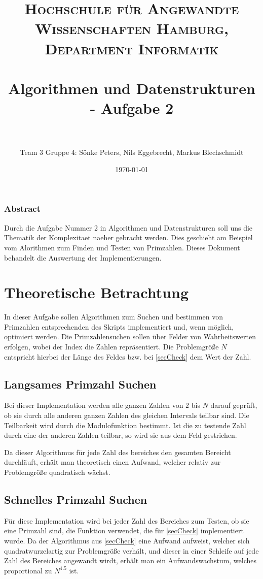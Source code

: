 \documentclass[paper=a4, fontsize=11pt]{scrartcl} %
\title{
\normalfont \normalsize
\textsc{Hochschule für Angewandte Wissenschaften Hamburg, Department Informatik} \\ [25pt] %
\horrule{0.5pt} \\[0.4cm] %
\huge Algorithmen und Datenstrukturen - Aufgabe 2 \\ %
\horrule{2pt} \\[0.5cm] %
}
\author{Team 3 Gruppe 4: Sönke Peters, Nils Eggebrecht, Markus Blechschmidt} %
\date{\normalsize\today} %
\numberwithin{equation}{section} %
\numberwithin{figure}{section} %
\numberwithin{table}{section} %
\begin{document}
\maketitle %

\subsubsection*{Abstract}
Durch die Aufgabe Nummer 2 in Algorithmen und Datenstrukturen soll uns die
Thematik der Komplexitaet naeher gebracht werden. Dies geschieht am Beispiel vom
Alorithmen zum Finden und Testen von Primzahlen. Dieses Dokument behandelt die
Auswertung der Implementierungen.

\renewcommand{\contentsname}{Inhaltsangabe}
\renewcommand*\listtablename{Tabellen}
\renewcommand*\listfigurename{Darstellungen}
\tableofcontents
\listoftables
\listoffigures

\section{Theoretische Betrachtung}

In dieser Aufgabe sollen Algorithmen zum Suchen und bestimmen von Primzahlen
entsprechenden des Skripts implementiert und, wenn m\"oglich, optimiert werden.
Die Primzahlensuchen sollen \"uber Felder von Wahrheitswerten erfolgen, wobei der
Index die Zahlen repr\"asentiert. Die Problemgr\"o{\ss}e $N$ entspricht hierbei
der L\"ange des Feldes bzw. bei \ref{secCheck} dem Wert der Zahl.

\subsection{Langsames Primzahl Suchen}\label{secSlow}
Bei dieser Implementation werden alle ganzen Zahlen von $2$ bis $N$ darauf
gepr\"uft, ob sie durch alle anderen ganzen Zahlen des gleichen Intervals teilbar
sind. Die Teilbarkeit wird durch die Modulofunktion bestimmt. Ist die zu testende
Zahl durch eine der anderen Zahlen teilbar, so wird sie aus dem Feld gestrichen.

Da dieser Algorithmus f\"ur jede Zahl des bereiches den gesamten Bereicht durchl\"auft,
erh\"alt man theoretisch einen Aufwand, welcher relativ zur Problemgr\"o{\ss}e
quadratisch w\"achst.

\subsection{Schnelles Primzahl Suchen}\label{secFast}
F\"ur diese Implementation wird bei jeder Zahl des Bereiches zum Testen, ob sie
eine Primzahl sind, die Funktion verwendet, die f\"ur \ref{secCheck} implementiert
wurde. Da der Algorithmus aus \ref{secCheck} eine Aufwand aufweist, welcher sich
quadratwurzelartig zur Problemgr\"o{\ss}e verh\"alt, und dieser in einer Schleife
auf jede Zahl des Bereiches angewandt wirdt, erh\"alt man ein Aufwandswachstum,
welches proportional zu $N^{1.5}$ ist.
\end{document}
